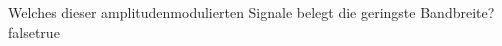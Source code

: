     {Welches dieser amplitudenmodulierten Signale belegt die geringste Bandbreite?}
    {}
    {}
    {}
    {}
    {false}{true}